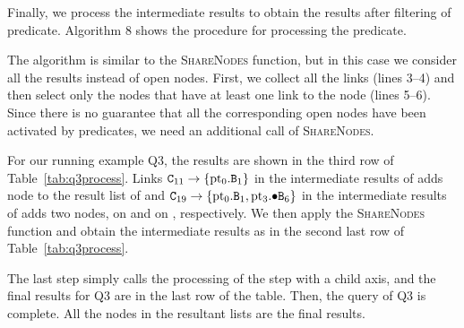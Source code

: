 Finally, we process the intermediate results to obtain the results after
filtering of predicate. Algorithm 8 shows the procedure for processing the
predicate.

The algorithm is similar to the \textsc{ShareNodes} function, but in this case
we consider all the results instead of open nodes. First, we collect all the
links (lines 3--4) and then select only the nodes that have at least one link to
the node (lines 5--6). Since there is no guarantee that all the corresponding
open nodes have been activated by predicates, we need an additional call of
\textsc{ShareNodes}.

For our running example Q3, the results are shown in the third row of
Table~\ref{tab:q3process}. Links $\hbox{\texttt{C$_{11}$}}\to\{\hbox{\textrm{pt}$_{0}$}.\hbox{\texttt{B$_{1}$}}\}$ in the
intermediate results of  adds node  to the result list of  and
$\hbox{\texttt{C$_{19}$}}\to\{\hbox{\textrm{pt}$_{0}$}.\hbox{\texttt{B$_{1}$}}, \hbox{\textrm{pt}$_{3}$}.\hbox{$\bullet$\texttt{B$_{6}$}}\}$ in the intermediate results
of  adds two nodes,  on  and  on , respectively.
We then apply the \textsc{ShareNodes} function and obtain the intermediate
results as in the second last row of Table~\ref{tab:q3process}.

The last step simply calls the processing of the step with a child axis, and the
final results for Q3 are in the last row of the table. Then, the query of Q3 is
complete. All the nodes in the resultant lists are the final results.


